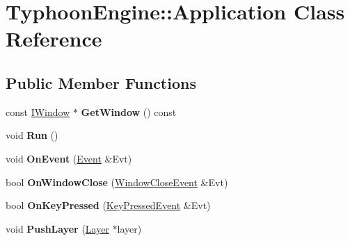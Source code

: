 \hypertarget{class_typhoon_engine_1_1_application}{}\section{Typhoon\+Engine\+::Application Class Reference}
\label{class_typhoon_engine_1_1_application}
\subsection*{Public Member Functions}
\begin{DoxyCompactItemize}
\item 
\mbox{\label{class_typhoon_engine_1_1_application_a08752059b30a1ba29a8140dbbf2f884c}} 
const \mbox{\hyperlink{class_typhoon_engine_1_1_i_window}{I\+Window}} $\ast$ {\bfseries Get\+Window} () const
\item 
\mbox{\label{class_typhoon_engine_1_1_application_ab162e610333f6824d6f3b6248b382c65}} 
void {\bfseries Run} ()
\item 
\mbox{\label{class_typhoon_engine_1_1_application_aaeaacf6ae9461ce875cbded9d37b4cc8}} 
void {\bfseries On\+Event} (\mbox{\hyperlink{class_typhoon_engine_1_1_event}{Event}} \&Evt)
\item 
\mbox{\label{class_typhoon_engine_1_1_application_a3804a3149bc9336115b84e9ea7a94d96}} 
bool {\bfseries On\+Window\+Close} (\mbox{\hyperlink{class_typhoon_engine_1_1_window_close_event}{Window\+Close\+Event}} \&Evt)
\item 
\mbox{\label{class_typhoon_engine_1_1_application_a675b2ec8bf5fe464ef64eb3a8e8bdf23}} 
bool {\bfseries On\+Key\+Pressed} (\mbox{\hyperlink{class_typhoon_engine_1_1_key_pressed_event}{Key\+Pressed\+Event}} \&Evt)
\item 
\mbox{\label{class_typhoon_engine_1_1_application_a91c4c560cc0e333ccb778b65d6738b3c}} 
void {\bfseries Push\+Layer} (\mbox{\hyperlink{class_typhoon_engine_1_1_layer}{Layer}} $\ast$layer)
\item 
\mbox{\label{class_typhoon_engine_1_1_application_a67823ba96fd5bf61b9242bbb99422a76}} 

\end{DoxyCompactItemize}

